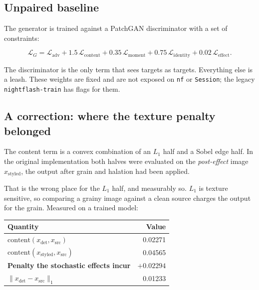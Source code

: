 \documentclass[11pt,a4paper]{article}
\newcommand{\code}[1]{\texttt{#1}}
\begin{document}
\subsection{Unpaired baseline}

The generator is trained against a PatchGAN discriminator with a set of
constraints:

\begin{equation}
  \mathcal{L}_G = \mathcal{L}_{\mathrm{adv}}
    + 1.5\,\mathcal{L}_{\mathrm{content}}
    + 0.35\,\mathcal{L}_{\mathrm{moment}}
    + 0.75\,\mathcal{L}_{\mathrm{identity}}
    + 0.02\,\mathcal{L}_{\mathrm{effect}} .
  \label{eq:baseline}
\end{equation}

The discriminator is the only term that sees targets as targets. Everything else
is a leash. These weights are fixed and are not exposed on \code{nf} or
\code{Session}; the legacy \code{nightflash-train} has flags for them.

\subsection{A correction: where the texture penalty belonged}

The content term is a convex combination of an $L_1$ half and a Sobel edge half.
In the original implementation both halves were evaluated on the
\emph{post-effect} image \emph{$x_{\text{styled}}$}, the output after grain and
halation had been applied.

That is the wrong place for the $L_1$ half, and measurably so. $L_1$ is texture
sensitive, so comparing a grainy image against a clean source charges the output
for the grain. Measured on a trained model:

\begin{center}
\begin{tabular}{@{}lr@{}}
\toprule
Quantity & Value \\
\midrule
$\mathrm{content}\!\left(x_{\text{det}}, x_{\text{src}}\right)$ & 0.02271 \\
$\mathrm{content}\!\left(x_{\text{styled}}, x_{\text{src}}\right)$ & 0.04565 \\
\textbf{Penalty the stochastic effects incur} & \textbf{$+0.02294$} \\
\midrule
$\lVert x_{\text{det}} - x_{\text{src}}\rVert_1$ & 0.01233 \\
\bottomrule
\end{tabular}
\end{center}
\end{document}
